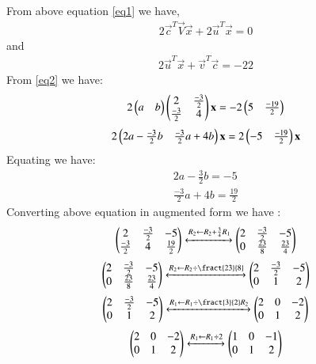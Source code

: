 \documentclass[journal,12pt,twocolumn]{IEEEtran}
\begin{document}
From above equation \eqref{eq1} we have,
\begin{align}\label{eq2}
2\vec{c}^T\vec{V}\vec{x}+2\vec{u}^T\vec{x}=0
\end{align}
and
\begin{align}
2\vec{u}^T\vec{x}+\vec{v}^T\vec{c}=-22
\end{align}
From \eqref{eq2} we have:
\begin{align}
 2\begin{pmatrix}{a} &{b}\end{pmatrix} \begin{pmatrix}2 & \frac{-3}{2} \\\frac{-3}{2} &4\end{pmatrix}\mathbf{x}=-2\begin{pmatrix}5 &\frac{-19}{2}  \end{pmatrix}
\end{align}
\begin{align}
 2\begin{pmatrix}2{a}-\frac{-3}{2} {b}&\frac{-3}{2}{a} + 4{b}\end{pmatrix}\mathbf{x}=2\begin{pmatrix}-5 &\frac{-19}{2}\end{pmatrix}\mathbf{x}
\end{align}
Equating we have:
\begin{align}
 2{a}-\frac{3}{2}{b}=-5 \\
 \frac{-3}{2}{a} +4{b}=\frac{19}{2}
\end{align}
Converting above equation in augmented form we have :
\begin{align}
\begin{pmatrix}
2&  \frac{-3}{2}& -5\\
\frac{-3}{2}& 4&\frac{19}{2}
\end{pmatrix}
  \xleftrightarrow[]{R_2 \leftarrow R_2+\frac{3}{4}R_1}
\begin{pmatrix}
2& \frac{-3}{2}& -5\\
0 & \frac{23}{8} & \frac{23}{4}\\
\end{pmatrix}
\end{align}
\begin{align}
\myvec{
2& \frac{-3}{2}& -5\\
0 & \frac{23}{8} & \frac{23}{4}\\
}
  \xleftrightarrow[]{R_2 \leftarrow R_2\div \fract{23}{8}}
\myvec{
2& \frac{-3}{2}& -5\\
0 & 1 & 2}\\
\end{align}
\begin{align}
\myvec{
2& \frac{-3}{2}& -5\\
0 & 1 & 2}
  \xleftrightarrow[]{R_1 \leftarrow R_1\div \fract{3}{2}R_2}
\myvec{
2& 0& -2\\
0 & 1 & 2}\\
\end{align}
\begin{align}
\begin{pmatrix}
2& 0& -2\\
0 & 1 & 2\end{pmatrix}
  \xleftrightarrow[]{R_1 \leftarrow R_1\div 2}
\begin{pmatrix}
1& 0& -1\\
0 & 1 & 2\end{pmatrix}
\end{align}
\end{document}
